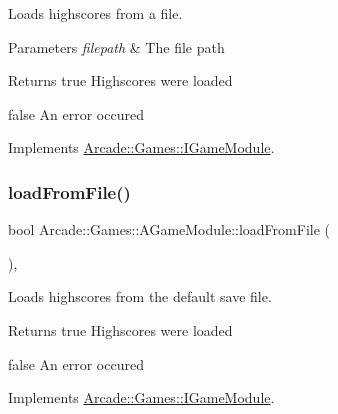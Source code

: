 Loads highscores from a file. 


\begin{DoxyParams}{Parameters}
{\em filepath} & The file path \\
\hline
\end{DoxyParams}
\begin{DoxyReturn}{Returns}
true Highscores were loaded 

false An error occured 
\end{DoxyReturn}


Implements \mbox{\hyperlink{classArcade_1_1Games_1_1IGameModule_a2a8cdd7c90677b6ebd0f97d99254d256}{Arcade\+::\+Games\+::\+I\+Game\+Module}}.

\mbox{\label{classArcade_1_1Games_1_1AGameModule_a61be4a5123cb5933b10fa0a4c34d8b06}} 
\subsubsection{\texorpdfstring{loadFromFile()}{loadFromFile()}\hspace{0.1cm}{\footnotesize\ttfamily [2/2]}}
{\footnotesize\ttfamily bool Arcade\+::\+Games\+::\+A\+Game\+Module\+::load\+From\+File (\begin{DoxyParamCaption}{ }\end{DoxyParamCaption})\hspace{0.3cm}{\ttfamily [final]}, {\ttfamily [virtual]}}



Loads highscores from the default save file. 

\begin{DoxyReturn}{Returns}
true Highscores were loaded 

false An error occured 
\end{DoxyReturn}


Implements \mbox{\hyperlink{classArcade_1_1Games_1_1IGameModule_add4c3468c03cc41fde2baf671a4bd026}{Arcade\+::\+Games\+::\+I\+Game\+Module}}.

\mbox{\label{classArcade_1_1Games_1_1AGameModule_a5897780d42d5faba3287c29b87f2b498}} 
